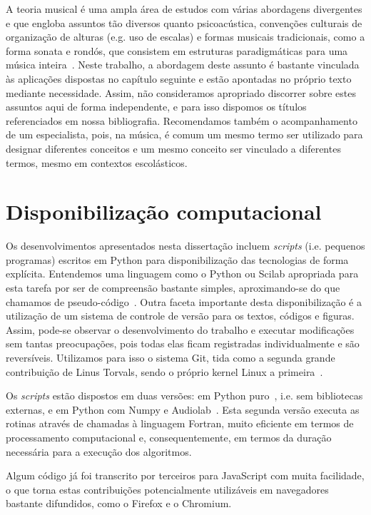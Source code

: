 A teoria musical é uma ampla área de estudos com várias abordagens divergentes e que engloba assuntos tão diversos quanto psicoacústica, convenções culturais de organização de alturas (e.g. uso de escalas) e formas musicais tradicionais, como a forma sonata e rondós, que consistem em estruturas paradigmáticas para uma música inteira~\cite{Zamacois,Schoenberg,microsound}. Neste trabalho, a abordagem deste assunto é bastante vinculada às aplicações dispostas no capítulo seguinte e estão apontadas no próprio texto mediante necessidade. Assim, não consideramos apropriado discorrer sobre estes assuntos aqui de forma independente, e para isso dispomos os títulos referenciados em nossa bibliografia. Recomendamos também o acompanhamento de um especialista, pois, na música, é comum um mesmo termo ser utilizado para designar diferentes conceitos e um mesmo conceito ser vinculado a diferentes termos, mesmo em contextos escolásticos.



    \section{Disponibilização computacional}
Os desenvolvimentos apresentados nesta dissertação incluem \emph{scripts} (i.e. pequenos programas) escritos em Python para disponibilização das tecnologias de forma explícita. Entendemos uma linguagem como o Python ou Scilab apropriada para esta tarefa
por ser de compreensão bastante simples, aproximando-se do que chamamos de pseudo-código~\cite{tutPython}. Outra faceta importante desta disponibilização é a utilização de um sistema de controle de versão para os textos, códigos e figuras. Assim, pode-se observar o desenvolvimento do trabalho e executar modificações sem tantas preocupações, pois todas elas ficam registradas individualmente e são reversíveis. Utilizamos para isso o sistema Git, tida como a segunda grande contribuição de Linus Torvals, sendo o próprio kernel Linux a primeira~\cite{gitBook}.

Os \emph{scripts} estão dispostos em duas versões: em Python puro~\cite{python}, i.e. sem bibliotecas externas, e em Python com Numpy e Audiolab~\cite{numpy,audiolab}. Esta segunda versão executa as rotinas através de chamadas à linguagem Fortran, muito eficiente em termos de processamento computacional e, consequentemente, em termos da duração necessária para a execução dos algoritmos.

Algum código já foi transcrito por terceiros para JavaScript com muita facilidade, o que torna estas contribuições potencialmente utilizáveis em navegadores bastante difundidos, como o Firefox e o Chromium.

